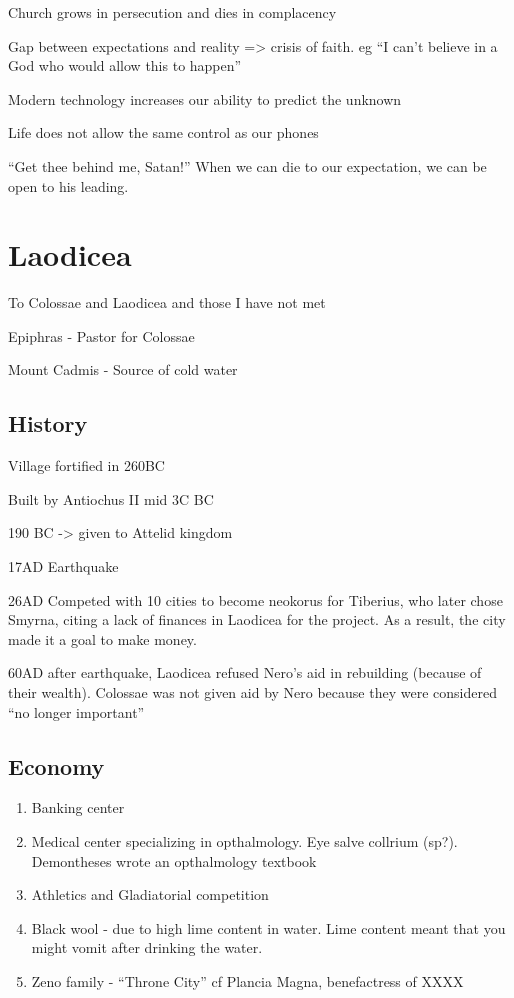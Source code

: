 \documentclass[
]{book}
\providecommand{\tightlist}{%
  \setlength{\itemsep}{0pt}\setlength{\parskip}{0pt}}
\begin{document}
Church grows in persecution and dies in complacency

Gap between expectations and reality =\textgreater{} crisis of faith. eg ``I can't believe in a God who would allow this to happen''

Modern technology increases our ability to predict the unknown

Life does not allow the same control as our phones

``Get thee behind me, Satan!'' When we can die to our expectation, we can be open to his leading.

\hypertarget{laodicea}{%
\chapter{Laodicea}\label{laodicea}}

To Colossae and Laodicea and those I have not met

Epiphras - Pastor for Colossae

Mount Cadmis - Source of cold water

\hypertarget{history-3}{%
\section{History}\label{history-3}}

Village fortified in 260BC

Built by Antiochus II mid 3C BC

190 BC -\textgreater{} given to Attelid kingdom

17AD Earthquake

26AD Competed with 10 cities to become neokorus for Tiberius, who later chose Smyrna, citing a lack of finances in Laodicea for the project. As a result, the city made it a goal to make money.

60AD after earthquake, Laodicea refused Nero's aid in rebuilding (because of their wealth). Colossae was not given aid by Nero because they were considered ``no longer important''

\hypertarget{economy}{%
\section{Economy}\label{economy}}

\begin{enumerate}
\def\labelenumi{\arabic{enumi})}
\tightlist
\item
  Banking center
\item
  Medical center specializing in opthalmology. Eye salve collrium (sp?). Demontheses wrote an opthalmology textbook
\item
  Athletics and Gladiatorial competition
\item
  Black wool - due to high lime content in water. Lime content meant that you might vomit after drinking the water.
\item
  Zeno family - ``Throne City'' cf Plancia Magna, benefactress of XXXX
\end{enumerate}
\end{document}

